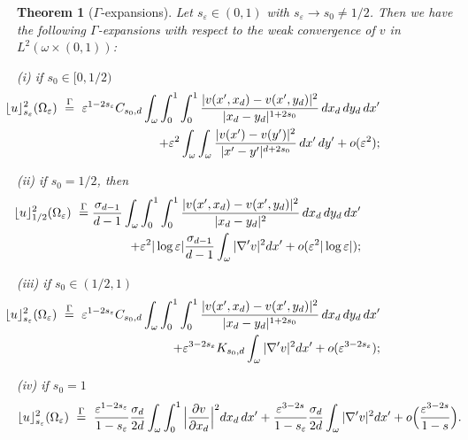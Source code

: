 \documentclass[11pt]{article}
\newtheorem{theorem}[definition]{Theorem}
\def\e{\varepsilon}
\begin{document}
\begin{theorem}[$\Gamma$-expansions]\label{gammaexp}
Let $s_\e\in(0,1)$ with $s_\e\to s_0\neq1/2$. Then we have the following $\Gamma$-expansions with respect to the weak convergence of $v$ in $L^2(\omega\times(0,1))$:

{\rm(i)} if $s_0\in[0,1/2)$ 
\begin{eqnarray*}&&\hskip-3cm
\lfloor u\rfloor^2_{s_\e}(\Omega_\e)\ \buildrel\Gamma\over =\ \e^{1-2s_\e}C_{s_0,d}\int_{\omega}\int_0^1\int_0^1\frac{|v(x^\prime, x_d)-v(x^\prime, y_d)|^2}{|x_d-y_d|^{1+2s_0}}\, dx_d\, dy_d\, dx^\prime
\\
&& +\e^2 \int_\omega\int_\omega 
\frac{|v(x')-v(y')|^2}{|x'-y'|^{d+2s_0}}\, dx^\prime \, dy^\prime
+o(\e^2);    
\end{eqnarray*}

{\rm(ii)} if $s_0=1/2$, then 
\begin{eqnarray*}&&\hskip-3.6cm
\lfloor u\rfloor^2_{1/2}(\Omega_\e)\ \buildrel\Gamma\over =\frac{\sigma_{d-1}}{d-1}\int_{\omega}\int_0^1\int_0^1\frac{|v(x^\prime, x_d)-v(x^\prime, y_d)|^2}{|x_d-y_d|^{2}}\, dx_d\, dy_d\, dx^\prime
\\ &&
+\e^{2}|\log\e|\frac{\sigma_{d-1}}{d-1}\int_{\omega} |\nabla' v|^2 dx'
+o(\e^{2}|\log\e|);
\end{eqnarray*}

{\rm(iii)} if $s_0\in(1/2,1)$ 
\begin{eqnarray*}&&\hskip-3cm
\lfloor u\rfloor^2_{s_\e}(\Omega_\e)\ \buildrel\Gamma\over =\ \e^{1-2s_\e}C_{s_0,d}\int_{\omega}\int_0^1\int_0^1\frac{|v(x^\prime, x_d)-v(x^\prime, y_d)|^2}{|x_d-y_d|^{1+2s_0}}\, dx_d\, dy_d\, dx^\prime
\\ &&
+\e^{3-2s_\e}K_{s_0,d}\int_{\omega} |\nabla' v|^2 dx'
+o(\e^{3-2s_\e});
\end{eqnarray*}


{\rm(iv)} if $s_0=1$ 
$$
\lfloor u\rfloor^2_{s_\e}(\Omega_\e)\ \buildrel\Gamma\over =\ \frac{\e^{1-2s_\e}}{1-s_\e}\frac{\sigma_{d}}{2d}\int_{\omega}\int_0^1\Big|\frac{\partial v}{\partial x_d}\Big|^2 dx_d\, dx^\prime
+\frac{\e^{3-2s}}{1-s_\e} \frac{\sigma_{d}}{2d}\int_{\omega} |\nabla' v|^2 dx'
+o\Big(\frac{\e^{3-2s}}{1-s}\Big).
$$
\end{theorem}
\end{document}
